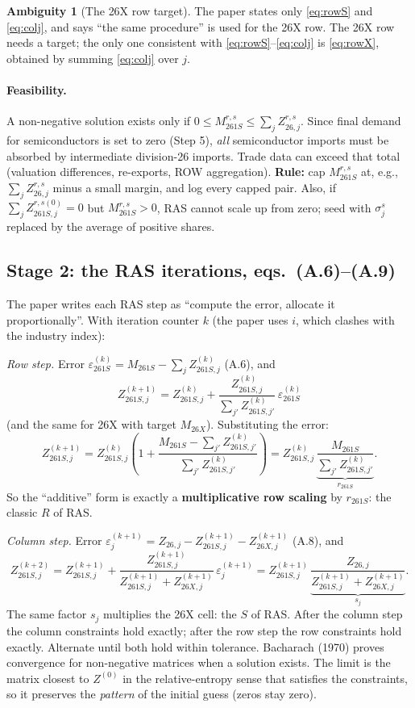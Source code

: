 \documentclass[11pt,a4paper]{article}
\theoremstyle{remark}
\theoremstyle{definition}
\newtheorem{issue}{Ambiguity}
\newcommand{\sem}{{261S}}   %
\newcommand{\oth}{{26X}}    %
\newcommand{\agg}{{26}}     %
\begin{document}
\begin{issue}[The \oth{} row target]
The paper states only \eqref{eq:rowS} and \eqref{eq:colj}, and says ``the same procedure'' is used for the \oth{}
row. The \oth{} row needs a target; the only one consistent with \eqref{eq:rowS}--\eqref{eq:colj} is
\eqref{eq:rowX}, obtained by summing \eqref{eq:colj} over $j$.
\end{issue}

\paragraph{Feasibility.} A non-negative solution exists only if $0\le M^{r,s}_\sem\le\sum_j Z^{r,s}_{\agg,j}$.
Since final demand for semiconductors is set to zero (Step 5), \emph{all} semiconductor imports must be absorbed by
intermediate division-26 imports. Trade data can exceed that total (valuation differences, re-exports, ROW
aggregation). \textbf{Rule:} cap $M^{r,s}_\sem$ at, e.g., $\sum_jZ^{r,s}_{\agg,j}$ minus a small margin, and log
every capped pair. Also, if $\sum_j Z^{r,s(0)}_{\sem,j}=0$ but $M^{r,s}_\sem>0$, RAS cannot scale up from zero;
seed with $\sigma^s_j$ replaced by the average of positive shares.

\subsection{Stage 2: the RAS iterations, eqs.~(A.6)--(A.9)}
The paper writes each RAS step as ``compute the error, allocate it proportionally''. With iteration counter $k$
(the paper uses $i$, which clashes with the industry index):

\emph{Row step.} Error $\varepsilon^{(k)}_\sem = M_\sem - \sum_j Z^{(k)}_{\sem,j}$ (A.6), and
\[
  Z^{(k+1)}_{\sem,j} = Z^{(k)}_{\sem,j} + \frac{Z^{(k)}_{\sem,j}}{\sum_{j'}Z^{(k)}_{\sem,j'}}\,\varepsilon^{(k)}_\sem
  \tag{A.7}
\]
(and the same for \oth{} with target $M_\oth$). Substituting the error:
\[
  Z^{(k+1)}_{\sem,j} = Z^{(k)}_{\sem,j}\left(1 + \frac{M_\sem - \sum_{j'}Z^{(k)}_{\sem,j'}}{\sum_{j'}Z^{(k)}_{\sem,j'}}\right)
  = Z^{(k)}_{\sem,j}\,\underbrace{\frac{M_\sem}{\sum_{j'}Z^{(k)}_{\sem,j'}}}_{r_\sem}.
\]
So the ``additive'' form is exactly a \textbf{multiplicative row scaling} by $r_\sem$: the classic $R$ of RAS.

\emph{Column step.} Error $\varepsilon^{(k+1)}_j = Z_{\agg,j} - Z^{(k+1)}_{\sem,j} - Z^{(k+1)}_{\oth,j}$ (A.8), and
\[
  Z^{(k+2)}_{\sem,j} = Z^{(k+1)}_{\sem,j} + \frac{Z^{(k+1)}_{\sem,j}}{Z^{(k+1)}_{\sem,j}+Z^{(k+1)}_{\oth,j}}\,\varepsilon^{(k+1)}_j
  = Z^{(k+1)}_{\sem,j}\,\underbrace{\frac{Z_{\agg,j}}{Z^{(k+1)}_{\sem,j}+Z^{(k+1)}_{\oth,j}}}_{s_j}.
  \tag{A.9}
\]
The same factor $s_j$ multiplies the \oth{} cell: the $S$ of RAS. After the column step the column constraints hold
exactly; after the row step the row constraints hold exactly. Alternate until both hold within tolerance.
Bacharach (1970) proves convergence for non-negative matrices when a solution exists. The limit is the matrix
closest to $Z^{(0)}$ in the relative-entropy sense that satisfies the constraints, so it preserves the
\emph{pattern} of the initial guess (zeros stay zero).
\end{document}
